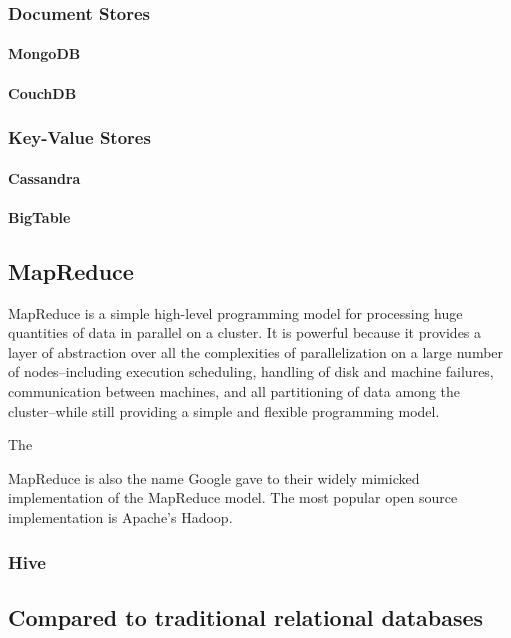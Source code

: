 \documentclass[11pt,a4paper]{report}
\begin{document}
\subsubsection*{Document Stores}
\paragraph*{MongoDB}
\paragraph*{CouchDB}
\subsubsection*{Key-Value Stores}
\paragraph*{Cassandra}
\paragraph*{BigTable}

\subsection*{MapReduce}
MapReduce is a simple high-level programming model for processing huge quantities of data in parallel on a cluster. It is powerful because it provides a layer of abstraction over all the complexities of parallelization on a large number of nodes--including  execution scheduling, handling of disk and machine failures, communication between machines, and all partitioning of data among the cluster--while still providing a simple and flexible programming model.\cite{dean2008mapreduce}

The 

MapReduce is also the name Google gave to their widely mimicked implementation of the MapReduce model. The most popular open source implementation is Apache's Hadoop. 
\subsubsection*{Hive}

\subsection*{Compared to traditional relational databases}

\pagebreak


\end{document}
